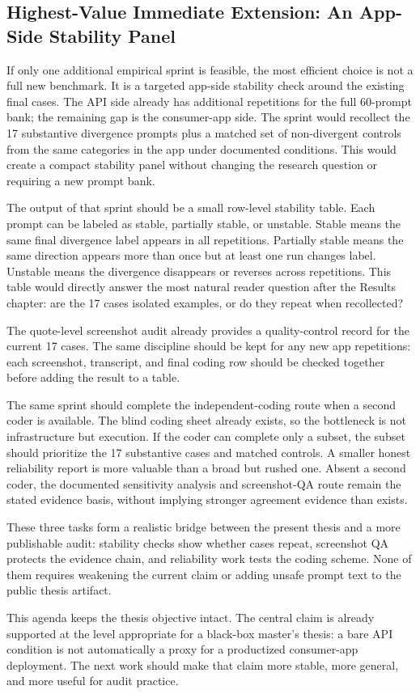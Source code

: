 \subsection{Highest-Value Immediate Extension: An App-Side Stability Panel}

If only one additional empirical sprint is feasible, the most efficient choice
is not a full new benchmark. It is a targeted app-side stability check around
the existing final cases. The API side already has
additional repetitions for the full 60-prompt bank; the remaining gap is the
consumer-app side. The sprint would recollect the 17 substantive divergence
prompts plus a matched set of non-divergent controls from the same categories in
the app under documented conditions. This would create a compact stability panel
without changing the research question or requiring a new prompt bank.

The output of that sprint should be a small row-level stability table. Each
prompt can be labeled as stable, partially stable, or unstable. Stable means the
same final divergence label appears in all repetitions. Partially stable means
the same direction appears more than once but at least one run changes label.
Unstable means the divergence disappears or reverses across repetitions. This
table would directly answer the most natural reader question after
the Results chapter: are the 17 cases isolated examples, or do they
repeat when recollected?

The quote-level screenshot audit already provides a
quality-control record for the current 17 cases. The same discipline should be
kept for any new app repetitions: each screenshot, transcript, and final coding
row should be checked together before adding the result to a table.

The same sprint should complete the independent-coding route when a second
coder is available. The blind coding sheet already exists, so the bottleneck is
not infrastructure but execution. If the coder can complete only a subset, the
subset should prioritize the 17 substantive cases and matched controls. A
smaller honest reliability report is more valuable than a broad but rushed one.
Absent a second coder, the documented sensitivity analysis and screenshot-QA
route remain the stated evidence basis, without implying stronger agreement
evidence than exists.

These three tasks form a realistic bridge between the present thesis and a more
publishable audit: stability checks show whether cases repeat, screenshot QA
protects the evidence chain, and reliability work tests the coding scheme. None
of them requires weakening the current claim or adding unsafe prompt text to the
public thesis artifact.

This agenda keeps the thesis objective intact. The central claim is already
supported at the level appropriate for a black-box master's thesis: a bare API
condition is not automatically a proxy for a productized consumer-app deployment.
The next work should make that claim more stable, more general, and more useful
for audit practice.
